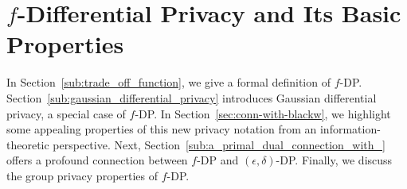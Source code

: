 \section{$f$-Differential Privacy and Its Basic Properties}
\label{sec:fDP}





In Section~\ref{sub:trade_off_function}, we give a formal definition of $f$-DP. Section~\ref{sub:gaussian_differential_privacy} introduces Gaussian differential privacy, a special case of $f$-DP. In Section~\ref{sec:conn-with-blackw}, we highlight some appealing properties of this new privacy notation from an information-theoretic perspective. Next, Section~\ref{sub:a_primal_dual_connection_with_} offers a profound connection between $f$-DP and $(\epsilon, \delta)$-DP. Finally, we discuss the group privacy properties of $f$-DP.






